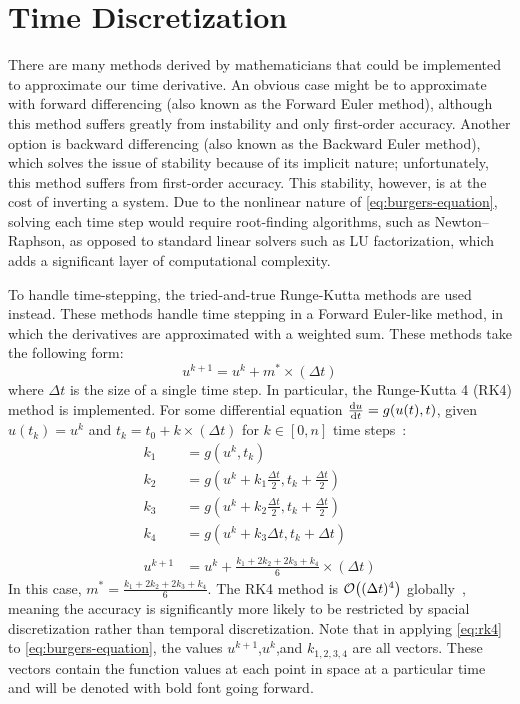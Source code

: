 \documentclass[ltr]{ornltm-app-mod} %
\numberwithin{equation}{section}
\begin{document}
    \section{Time Discretization} \label{sec:time-discretization}
    There are many methods derived by mathematicians that could be implemented to approximate our time derivative.
    An obvious case might be to approximate with forward differencing (also known as the Forward Euler method), although this method suffers greatly from instability and only first-order accuracy.
    Another option is backward differencing (also known as the Backward Euler method), which solves the issue of stability because of its implicit nature; unfortunately, this method suffers from first-order accuracy.
    This stability, however, is at the cost of inverting a system.
    Due to the nonlinear nature of \cref{eq:burgers-equation}, solving each time step would require root-finding algorithms, such as Newton--Raphson, as opposed to standard linear solvers such as LU factorization, which adds a significant layer of computational complexity.

    To handle time-stepping, the tried-and-true Runge-Kutta methods are used instead.
    These methods handle time stepping in a Forward Euler-like method, in which the derivatives are approximated with a weighted sum.
    These methods take the following form:
    \begin{equation}
        \label{eq:general-rk-method}
        u^{k+1}=u^k+m^* \times (\Delta t)
    \end{equation}
    where $\Delta t$ is the size of a single time step.
    In particular, the Runge-Kutta 4 (RK4) method is implemented.
    For some differential equation $\dv{u}{t}=g(u(t),t)$, given $u(t_k)=u^k$ and $t_k=t_0+k\times(\Delta t)$ for $k\in[0,n]$ time steps~\autocite{FourthOrderRungeKutta}:
    \begin{equation}
        \label{eq:rk4}
        \begin{split}
            k_1&=g\left( u^k,t_k \right)\\
            k_2&=g\left( u^k+k_1\frac{\Delta t}{2},t_k+\frac{\Delta t}{2} \right)\\
            k_3&=g\left( u^k+k_2\frac{\Delta t}{2},t_k+\frac{\Delta t}{2} \right)\\
            k_4 &= g\left( u^k+k_3 \Delta t,t_k+\Delta t \right)\\ \\
            u^{k+1}&=u^k+\frac{k_1+2k_2+2k_3+k_4}{6}\times(\Delta t)
        \end{split}
    \end{equation}
    In this case, $m^* = \frac{k_1+2k_2+2k_3+k_4}{6}$.
    The RK4 method is $\order{(\Delta t)^4}$ globally~\autocite{FourthOrderRungeKutta}, meaning the accuracy is significantly more likely to be restricted by spacial discretization rather than temporal discretization.
    Note that in applying \cref{eq:rk4} to \cref{eq:burgers-equation}, the values $u^{k+1}$,$u^k$,and $k_{1,2,3,4}$ are all vectors.
    These vectors contain the function values at each point in space at a particular time and will be denoted with bold font going forward.
\end{document}
